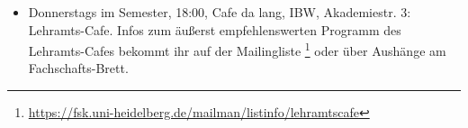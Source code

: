 \begin{itemize}
\item Donnerstags im Semester, 18:00, Cafe da lang, IBW, Akademiestr. 3: Lehramts-Cafe. Infos zum äußerst empfehlenswerten Programm des Lehramts-Cafes bekommt ihr auf der Mailingliste \footnote{\url{https://fsk.uni-heidelberg.de/mailman/listinfo/lehramtscafe}} oder über Aushänge am Fachschafts-Brett.
\end{itemize}
\fi

